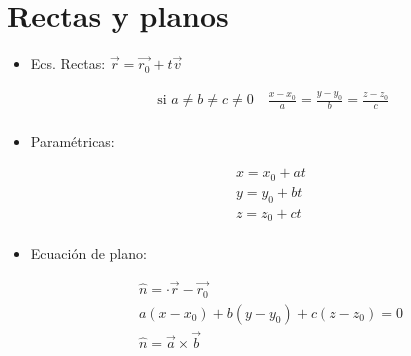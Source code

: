 \section{Rectas y planos}
\begin{itemize}
    \item Ecs. Rectas: $\vec{r}= \vec{r_0} + t \vec{v}$ 
        \begin{center}
            \begin{align*}
                \text{  si  } a \neq b \neq c \neq 0    \quad \frac{x-x_0}{a} = \frac{y-y_0}{b} = \frac{z-z_0}{c}  \\ 
            \end{align*}
        \end{center}
    
    \item Paramétricas:
        \begin{center}
            \begin{align*}
                x = x_0 +at \\ 
                y = y_0 +bt \\ 
                z = z_0 +ct \\ 
            \end{align*}
        \end{center}
    
    \item Ecuación de plano:
        \begin{center}
            \begin{align*}
                \hat{n} = \cdot \vec{r}-\vec{r_0} \\ 
                a(x-x_0)+b(y-y_0) + c(z-z_0) = 0 \\ 
                \hat{n}= \vec{a} \times  \vec{b} \\ 
            \end{align*}
        \end{center}
\end{itemize}

